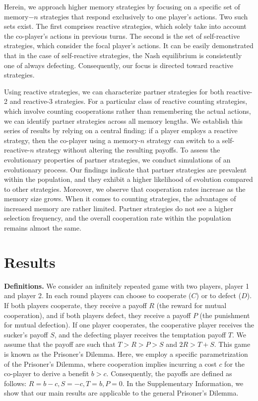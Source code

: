 \documentclass{article}
\theoremstyle{definition}
\begin{document}
Herein, we approach higher memory strategies by focusing on a specific set of
memory$-n$ strategies that respond exclusively to one player's actions. Two such
sets exist. The first comprises reactive strategies, which solely take into
account the co-player's actions in previous turns. The second is the set of
self-reactive strategies, which consider the focal player's actions. It can be
easily demonstrated that in the case of self-reactive strategies, the Nash
equilibrium is consistently one of always defecting. Consequently, our focus is
directed toward reactive strategies.

Using reactive strategies, we can characterize partner strategies for both
reactive-2 and reactive-3 strategies. For a particular class of reactive
counting strategies, which involve counting cooperations rather than remembering
the actual actions, we can identify partner strategies across all memory
lengths. We establish this series of results by relying on a central finding: if
a player employs a reactive strategy, then the co-player using a memory-$n$
strategy can switch to a self-reactive-$n$ strategy without altering the
resulting payoffs. To assess the evolutionary properties of partner strategies,
we conduct simulations of an evolutionary process. Our findings indicate that
partner strategies are prevalent within the population, and they exhibit a
higher likelihood of evolution compared to other strategies. Moreover, we
observe that cooperation rates increase as the memory size grows.
When it comes to counting strategies, the advantages of increased
memory are rather limited. Partner strategies do not see a higher selection
frequency, and the overall cooperation rate within the population remains
almost the same.

\section{Results}

\textbf{Definitions.}
We consider an infinitely repeated game with two players, player 1 and player 2.
In each round players can choose to cooperate ($C$) or to defect ($D$). If
both players cooperate, they receive a payoff $R$ (the reward for mutual
cooperation), and if both players defect, they receive a payoff $P$ (the
punishment for mutual defection). If one player cooperates, the cooperative
player receives the sucker's payoff $S$, and the defecting player receives the
temptation payoff $T$. We assume that the payoff are such that $T > R > P > S$
and $2 R > T + S$. This game is known as the Prisoner's Dilemma. Here, we employ
a specific parametrization of the Prisoner's Dilemma, where cooperation implies
incurring a cost $c$ for the co-player to derive a benefit $b > c$.
Consequently, the payoffs are defined as follows: \(R = b - c, S = -c, T = b, P
= 0\). In the Supplementary Information, we show that our main results
are applicable to the general Prisoner's Dilemma.
\end{document}
